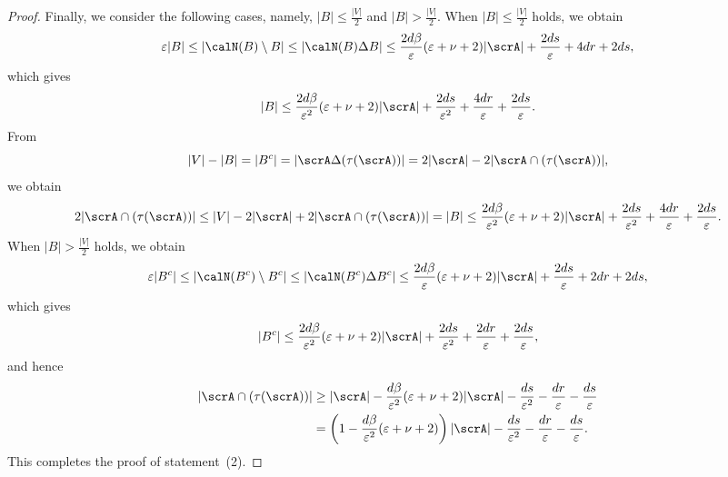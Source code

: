 \begin{proof}
Finally, we consider the following cases, namely, $|B|\leq \frac{|V|}2$ and $|B| > \frac{|V|}2$. When $|B|\leq \frac{|V|}2$ holds, we obtain 
$$
\varepsilon |B| \leq |\calN(B) \setminus B| \leq |\calN(B) \Delta B|  \leq \frac{2d \beta}\varepsilon (\varepsilon + \nu + 2)|\scrA| +  \frac {2ds}\varepsilon  + 4dr +2ds,
$$
which gives 
$$|B| \leq \frac {2d\beta}{ \varepsilon^2} ( \varepsilon + \nu + 2) |\scrA|+  \frac {2ds}{\varepsilon ^2} + \frac{4dr}\varepsilon +\frac{2ds}{\varepsilon}.
$$
From 
$$
|V| - |B| 
 = |B^c| 
  = |\scrA \Delta (\tau (\scrA))| 
 = 2|\scrA| - 2|\scrA\cap (\tau(\scrA))| ,
$$
we obtain 
$$
2|\scrA \cap (\tau(\scrA)) |
\leq |V| - 2|\scrA| + 2|\scrA \cap (\tau(\scrA))|
= |B| 
\leq \frac{2d \beta}{\varepsilon^2} (\varepsilon + \nu + 2)|\scrA|+  \frac {2ds}{\varepsilon^2} + \frac{4dr}\varepsilon +\frac{2ds}{\varepsilon}.
$$
When $|B| > \frac{|V|}2$ holds, we obtain 
$$
\varepsilon |B^c| \leq |\calN(B^c)\setminus B^c| \leq |\calN(B^c)\Delta B^c|  
\leq \frac{2d\beta}{\varepsilon}(\varepsilon + \nu + 2) |\scrA|+  \frac {2ds}\varepsilon + 2dr + 2ds ,
$$
which gives 
$$|B^c| \leq \frac{2d\beta}{\varepsilon^2}(\varepsilon + \nu + 2) |\scrA|+  \frac {2ds}{\varepsilon ^2} +\frac{2dr}{\varepsilon}
+\frac{2ds}{\varepsilon},
$$
and hence 
\begin{align*}
|\scrA \cap (\tau(\scrA)) |
&\geq |\scrA| - \frac {d\beta}{ \varepsilon^2} ( \varepsilon + \nu + 2)|\scrA| -  \frac {ds}{\varepsilon^2} -\frac{dr}{\varepsilon}
-\frac{ds}{\varepsilon}\\
&= \left( 1- \frac {d\beta}{ \varepsilon^2} ( \varepsilon + \nu + 2)\right)|\scrA| - \frac {ds}{\varepsilon^2}
-\frac{dr}{\varepsilon}
-\frac{ds}{\varepsilon} .
\end{align*}
This completes the proof of statement~(2). 
\end{proof}

